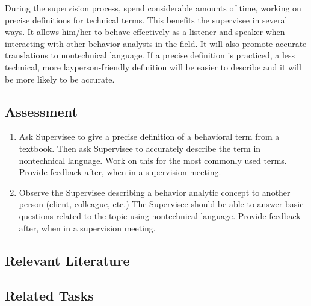 During the supervision process, spend considerable amounts of time, working on precise definitions for technical terms. This benefits the supervisee in several ways. It allows him/her to behave effectively as a listener and speaker when interacting with other behavior analysts in the field. It will also promote accurate translations to nontechnical language. If a precise definition is practiced, a less technical, more layperson-friendly definition will be easier to describe and it will be more likely to be accurate.
%
\subsection{Assessment}
\begin{enumerate}
\item Ask Supervisee to give a precise definition of a behavioral term from a textbook. Then ask Supervisee to accurately describe the term in nontechnical language. Work on this for the most commonly used terms. Provide feedback after, when in a supervision meeting.
\item Observe the Supervisee describing a behavior analytic concept to another person (client, colleague, etc.) The Supervisee should be able to answer basic questions related to the topic using nontechnical language. Provide feedback after, when in a supervision meeting.
\end{enumerate}
%
\subsection{Relevant Literature}
\begin{refsection}
\nocite{bailey1991marketing,
        lindsley1991technical,
        malott1992should}
\printbibliography[heading=none]
\end{refsection}
\subsection{Related Tasks}
\fourgSix{}\\
\fouriSix{}\\
\fourjSix{}\\
\fourjSeven{}\\
\fourkOne{}\\
\fourkThree{}\\
\fourkEight{}\\
\fourkNine{}\\
%
\clearpage \section[\fourgTwo{}]{\fourgTwo{}%
              }
